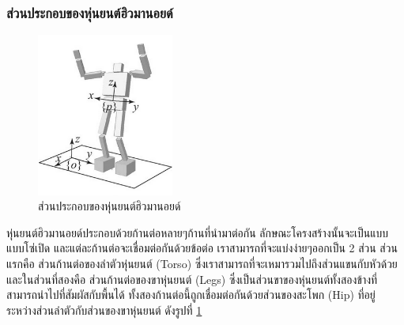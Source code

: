 \subsubsection{ส่วนประกอบของหุ่นยนต์ฮิวมานอยด์}
\begin{figure}[ht]
	\centering
	\includegraphics[width=0.4\textwidth]{chapter2/images/robot_component.png}
	\caption{ส่วนประกอบของหุ่นยนต์ฮิวมานอยด์}
	\label{fig:robot_component}
\end{figure}
หุ่นยนต์ฮิวมานอยด์ประกอบด้วยก้านต่อหลายๆก้านที่นำมาต่อกัน ลักษณะโครงสร้างนั้นจะเป็นแบบแบบโซ่เปิด
และแต่ละก้านต่อจะเชื่อมต่อกันด้วยข้อต่อ เราสามารถที่จะแบ่งง่ายๆออกเป็น 2 ส่วน ส่วนแรกคือ
ส่วนก้านต่อของลำตัวหุ่นยนต์ (Torso) ซึ่งเราสามารถที่จะเหมารวมไปถึงส่วนแขนกับหัวด้วย
และในส่วนที่สองคือ ส่วนก้านต่อของขาหุ่นยนต์ (Legs) ซึ่งเป็นส่วนขาของหุ่นยนต์ทั้งสองข้างที่สามารถนำไปที่สัมผัสกับพื้นได้
ทั้งสองก้านต่อนี้ถูกเชื่อมต่อกันด้วยส่วนของสะโพก (Hip) ที่อยู่ระหว่างส่วนลำตัวกับส่วนของขาหุ่นยนต์ ดังรูปที่ \ref{fig:robot_component}

